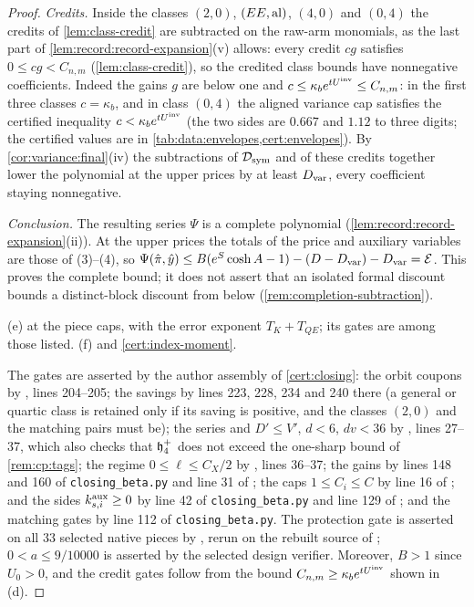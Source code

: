 \begin{proof}
\emph{Credits.} Inside the classes $(2,0)$, $(EE,{\rm al})$, $(4,0)$ and
$(0,4)$ the credits of \cref{lem:class-credit} are subtracted on the raw-arm
monomials, as the last part of \cref{lem:record:record-expansion}(v) allows:
every credit $cg$ satisfies $0\le cg<C_{n,m}$ (\cref{lem:class-credit}), so the
credited class bounds have nonnegative coefficients. Indeed the
gains $g$ are below one and $c\le\kappa_be^{tU^{\mathrm{inv}}}\le
C_{n,m}$: in the first three classes $c=\kappa_b$, and in class
$(0,4)$ the aligned variance cap satisfies the certified
inequality $c<\kappa_be^{tU^{\mathrm{inv}}}$ (the two sides are $0.667$
and $1.12$ to three digits; the certified values are in
\cref{tab:data:envelopes,cert:envelopes}). By
\cref{cor:variance:final}(iv) the subtractions of $\mathcal D_{\rm sym}$ and of
these credits together lower the polynomial at the upper prices by at least
$D_{\rm var}$, every coefficient staying nonnegative.

\emph{Conclusion.} The resulting series $\Psi$ is a complete polynomial
(\cref{lem:record:record-expansion}(ii)). At the upper prices the totals of
the price and auxiliary variables are those of (3)--(4), so
$\Psi(\hat\pi,\hat y)\le B(e^S\cosh A-1)-(D-D_{\rm var})-D_{\rm var}=\mathcal E$.
This proves the complete bound; it does not assert that an isolated formal
discount bounds a distinct-block discount from below
(\cref{rem:completion-subtraction}).

(e)  at the piece caps, with the error exponent
$T_K+T_{QE}$; its gates are among those listed. (f)
 and
\cref{cert:index-moment}.

The gates are asserted by the author assembly of \cref{cert:closing}: the
orbit coupons by ,
lines 204--205; the savings by lines 223, 228, 234 and 240 there (a general or
quartic class is retained only if its saving is positive, and the classes
$(2,0)$ and the matching pairs must be); the series and $D'\le V'$, $d<6$,
$dv<36$ by ,
lines 27--37, which also checks that $\mathfrak h_4^+$ does not exceed the
one-sharp bound of \cref{rem:cp:tags}; the regime $0\le\ell\le C_X/2$ by
, lines 36--37;
the gains by lines 148 and 160 of \texttt{closing\_beta.py} and line 31 of
; the caps
$1\le C_i\le C$ by line 16 of
; and the
sides $k^{\rm aux}_{s,i}\ge0$ by line 42 of \texttt{closing\_beta.py} and line
129 of ; and the
matching gates by line 112 of \texttt{closing\_beta.py}. The
protection gate is asserted on all $33$ selected native pieces by
, rerun
on the rebuilt source of ;
$0<a\le9/10000$ is asserted by the selected design verifier.
Moreover, $B>1$ since $U_0>0$, and the credit gates follow from the
bound $C_{n,m}\ge\kappa_be^{tU^{\mathrm{inv}}}$ shown in (d).


\end{proof}
